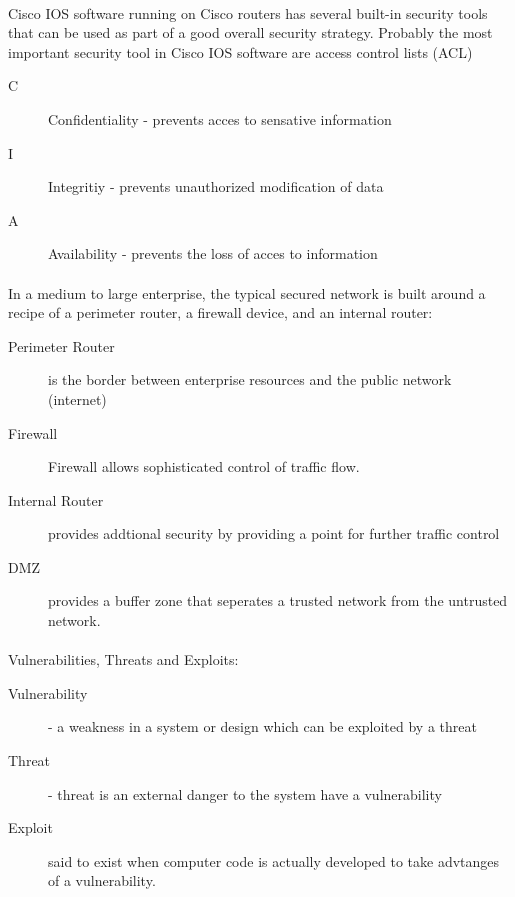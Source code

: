 \documentclass[10pt,landscape]{article}
\begin{document}
\begin{multicols}{3}
\paragraph{}
Cisco IOS software running on Cisco routers has several built-in security tools that can be used as part of a good overall security strategy. Probably the most important security tool in Cisco IOS software are access control lists (ACL)
\begin{description}
	\item[C] Confidentiality - prevents acces to sensative information
	\item[I] Integritiy - prevents unauthorized modification of data
	\item[A] Availability  - prevents the loss of acces to information
\end{description}
\paragraph{}
In a medium to large enterprise, the typical secured network is built around a recipe of a perimeter router, a firewall device, and an internal router:
\begin{description}
	\item[Perimeter Router] is the border between enterprise resources and the public network (internet)
	\item[Firewall] Firewall allows sophisticated control of traffic flow.
	\item[Internal Router]  provides addtional security by providing a point for further traffic control
	\item[DMZ] provides a buffer zone that seperates a trusted network from the untrusted network.
\end{description}
\paragraph{}
Vulnerabilities, Threats and Exploits:
\begin{description}
	\item[Vulnerability] - a weakness in a system or design which can be exploited by a threat
	\item[Threat] - threat is an external danger to the system have a vulnerability
	\item[Exploit] said to exist when computer code is actually developed to take advtanges of a vulnerability.
\end{description}


\end{multicols}
\end{document}
